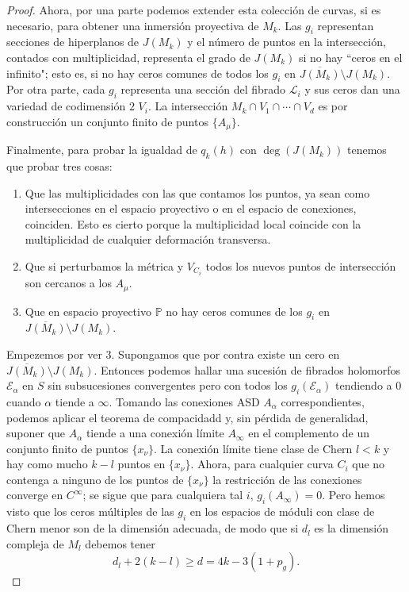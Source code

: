 \documentclass[12pt, a4paper]{amsart}
\newcommand\PP{\mathbb{P}}
\newcommand\EE{\mathscr{E}}
\newcommand\LL{\mathscr{L}}
\theoremstyle{remark} \newtheorem{rmk}[thm]{Observación}
\theoremstyle{remark} \newtheorem{rmks}[thm]{Observaciones}
\theoremstyle{definition} \newtheorem{defn}[thm]{Definición}
\theoremstyle{definition} \newtheorem{ejs}[thm]{Ejemplos}
\theoremstyle{definition} \newtheorem{ej}[thm]{Ejemplo}
\begin{document}
\begin{proof}
	Ahora, por una parte podemos extender esta colección de curvas, si es necesario, para obtener una inmersión proyectiva de $M_k$. Las $g_i$ representan secciones de hiperplanos de $J(M_k)$ y el número de puntos en la intersección, contados con multiplicidad, representa el grado de $J(M_k)$ si no hay ``ceros en el infinito"; esto es, si no hay ceros comunes de todos los $g_i$ en $\overline{J(M_k)}\setminus J(M_k)$. Por otra parte, cada $g_i$ representa una sección del fibrado $\LL_i$ y sus ceros dan una variedad de codimensión $2$ $V_{i}$. La intersección $M_k \cap V_1 \cap \cdots \cap V_d$ es por construcción un conjunto finito de puntos $\{A_\mu\}$.

	Finalmente, para probar la igualdad de $q_k(h)$ con $\deg(J(M_k))$ tenemos que probar tres cosas:
	\begin{enumerate}
		\item Que las multiplicidades con las que contamos los puntos, ya sean como intersecciones en el espacio proyectivo o en el espacio de conexiones, coinciden. Esto es cierto porque la multiplicidad local coincide con la multiplicidad de cualquier deformación transversa.
		\item Que si perturbamos la métrica y $V_{C_i}$ todos los nuevos puntos de intersección son cercanos a los $A_\mu$.
		\item Que en espacio proyectivo  $\PP$ no hay ceros comunes de los $g_i$ en $\overline{J(M_k)}\setminus J(M_k)$.
	\end{enumerate}

	Empezemos por ver 3. Supongamos que por contra existe un cero en $\overline{J(M_k)}\setminus J(M_k)$. Entonces podemos hallar una sucesión de fibrados holomorfos $\EE_\alpha$ en $S$ sin subsucesiones convergentes pero con todos los $g_i(\EE_\alpha)$ tendiendo a $0$ cuando $\alpha$ tiende a $\infty$. Tomando las conexiones ASD $A_\alpha$ correspondientes, podemos aplicar el teorema de compacidadd y, sin pérdida de generalidad, suponer que $A_\alpha$ tiende a una conexión límite $A_\infty$ en el complemento de un conjunto finito de puntos $\{x_\nu\}$. La conexión límite tiene clase de Chern  $l<k$ y hay como mucho  $k-l$ puntos en $\{x_\nu\}$. Ahora, para cualquier curva $C_i$ que no contenga a ninguno de los puntos de $\{x_\nu\}$ la restricción de las conexiones converge en $C^\infty$; se sigue que para cualquiera tal  $i$, $g_i(A_\infty)=0$. Pero hemos visto que los ceros múltiples de las $g_i$ en los espacios de móduli con clase de Chern menor son de la dimensión adecuada, de modo que si $d_l$ es la dimensión compleja de $M_l$ debemos tener
	\begin{equation*}
		d_l + 2(k-l) \geq d=4k-3(1+p_g).
	\end{equation*} 


\end{proof}
\end{document}
